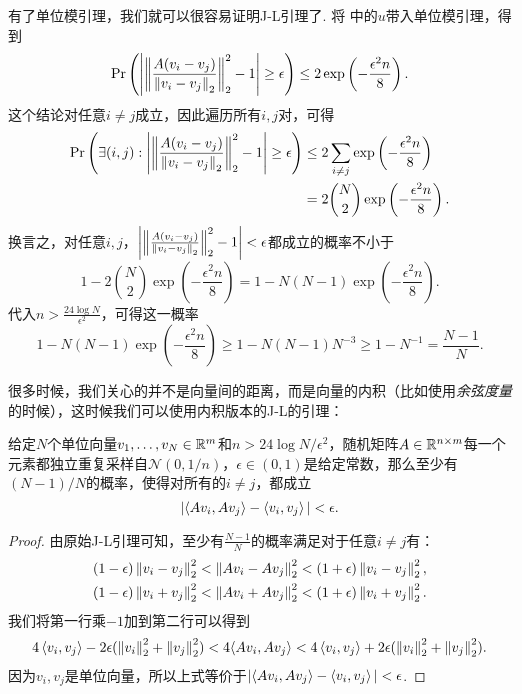 有了单位模引理，我们就可以很容易证明J-L引理了. 将 中的$u$带入单位模引理，得到
\[
    \Pr\left(\left|\left\|\frac{A(v_i-v_j)}{\left\|v_i-v_j\right\|_2}\right\|_2^2 - 1 \right| \geq \epsilon\right)\leq  2\exp \left(-\frac{\epsilon^2 n}{8}\right). 
\]
这个结论对任意$i\neq j$成立，因此遍历所有$i,j$对，可得
\[
\begin{aligned}
    \Pr\left(\exists (i,j): \left|\left\|\frac{A(v_i-v_j)}{\left\|v_i-v_j\right\|_2}\right\|_2^2 - 1 \right| \geq \epsilon\right)
    &\leq 2 \sum_{i\neq j} \exp \left(-\frac{\epsilon^2 n}{8}\right) \\
    &=  2  \binom{N}{2}\exp \left(-\frac{\epsilon^2 n}{8}\right). 
\end{aligned}
\]
换言之，对任意$i,j$，$\left|\left\|\frac{A(v_i-v_j)}{\left\|v_i-v_j\right\|_2}\right\|_2^2 - 1 \right| < \epsilon$都成立的概率不小于
\[
1 - 2  \binom{N}{2}\exp \left(-\frac{\epsilon^2 n}{8}\right) = 1 - N(N-1)\exp \left(-\frac{\epsilon^2 n}{8}\right). 
\]
代入$n > \frac{24\log N}{\epsilon^2}$，可得这一概率
\[
1 - N(N-1)\exp \left(-\frac{\epsilon^2 n}{8}\right) \geq 1 - N(N-1)N^{-3}\geq 1 - N^{-1} = \frac{N-1}{N}. 
\]

很多时候，我们关心的并不是向量间的距离，而是向量的内积（比如使用\emph{余弦度量}的时候），这时候我们可以使用内积版本的J-L的引理：
\begin{theorem}\label{thm:johnson-lindenstrauss-lemma-inner-product}
    给定$N$个单位向量$v_1,\dots,v_N\in\mathbb{R}^m$和$n > 24\log N/\epsilon^2$，随机矩阵$A\in \mathbb{R}^{n\times m}$每一个元素都独立重复采样自$\mathcal N(0,1/n)$，$\epsilon \in (0,1)$是给定常数，那么至少有$(N-1)/N$的概率，使得对所有的$i\neq j$，都成立
    \[
        |\langle Av_i, Av_j\rangle - \left\langle{v_i},{v_j}\right\rangle|< \epsilon.
    \]
\end{theorem}    
\begin{proof}
由原始J-L引理可知，至少有$\frac{N-1}{N}$的概率满足对于任意$i\neq j$有：
    \[
    \begin{aligned}
        &(1 - \epsilon)\left\|v_i-v_j\right\|_2^2 < \left\|Av_i-Av_j\right\|_2^2< (1 + \epsilon)\left\|v_i-v_j\right\|_2^2, \\
        &(1 - \epsilon)\left\|v_i+v_j\right\|_2^2 < \left\|Av_i+Av_j\right\|_2^2 < (1 + \epsilon)\left\|v_i+v_j\right\|_2^2. 
    \end{aligned}
    \]
我们将第一行乘$-1$加到第二行可以得到
    \[
        4\left\langle{v_i},{v_j}\right\rangle - 2 \epsilon (\left\|v_i\right\|_2^2 + \left\|v_j\right\|_2^2) <4\langle Av_i, Av_j\rangle < 4\left\langle{v_i},{v_j}\right\rangle + 2 \epsilon (\left\|v_i\right\|_2^2 + \left\|v_j\right\|_2^2).
    \]
因为$v_i,v_j$是单位向量，所以上式等价于$|\langle Av_i, Av_j\rangle - \left\langle{v_i},{v_j}\right\rangle|<\epsilon$. 
\end{proof}

